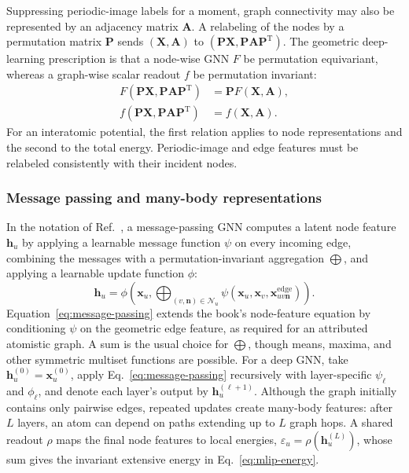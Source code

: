 \documentclass[10pt,a4paper,twocolumn]{article}
\begin{document}
Suppressing periodic-image labels for a moment, graph connectivity may also be
represented by an adjacency matrix $\bm A$. A relabeling of the nodes by a
permutation matrix $\bm P$ sends
$(\bm X,\bm A)$ to $(\bm P\bm X,\bm P\bm A\bm P^{\mathrm T})$. The geometric
deep-learning prescription is that a node-wise GNN $F$ be permutation
equivariant, whereas a graph-wise scalar readout $f$ be permutation invariant:
\begin{align}
  F(\bm P\bm X,\bm P\bm A\bm P^{\mathrm T})
    &=\bm P F(\bm X,\bm A),
  \\
  f(\bm P\bm X,\bm P\bm A\bm P^{\mathrm T})
    &=f(\bm X,\bm A).
  \label{eq:graph-permutation}
\end{align}
For an interatomic potential, the first relation applies to node
representations and the second to the total energy. Periodic-image and edge
features must be relabeled consistently with their incident nodes.

\subsubsection{Message passing and many-body representations}

In the notation of Ref.~\cite{bronstein2021}, a message-passing GNN computes a
latent node feature $\bm h_u$ by applying a learnable message function $\psi$
on every incoming edge, combining the messages with a
permutation-invariant aggregation $\bigoplus$, and applying a learnable update
function $\phi$:
\begin{equation}
  \bm h_u
  =\phi\!\left(
      \bm x_u,
      \bigoplus_{(v,\bm n)\in\mathcal N_u}
      \psi\!\left(\bm x_u,\bm x_v,
                   \bm x_{uv\bm n}^{\mathrm{edge}}\right)
    \right).
  \label{eq:message-passing}
\end{equation}
Equation~\eqref{eq:message-passing} extends the book's node-feature equation
by conditioning $\psi$ on the geometric edge feature, as required for an
attributed atomistic graph. A sum is the usual choice for $\bigoplus$, though
means, maxima, and other symmetric multiset functions are possible. For a
deep GNN, take $\bm h_u^{(0)}=\bm x_u^{(0)}$, apply
Eq.~\eqref{eq:message-passing} recursively with layer-specific
$\psi_\ell$ and $\phi_\ell$, and denote each layer's output by
$\bm h_u^{(\ell+1)}$. Although the graph initially contains only pairwise
edges, repeated updates create many-body features: after $L$ layers, an atom
can depend on paths extending up to $L$ graph hops. A shared readout $\rho$
maps the final node features to local energies,
$\varepsilon_u=\rho(\bm h_u^{(L)})$, whose sum gives the invariant extensive
energy in Eq.~\eqref{eq:mlip-energy}.
\end{document}

